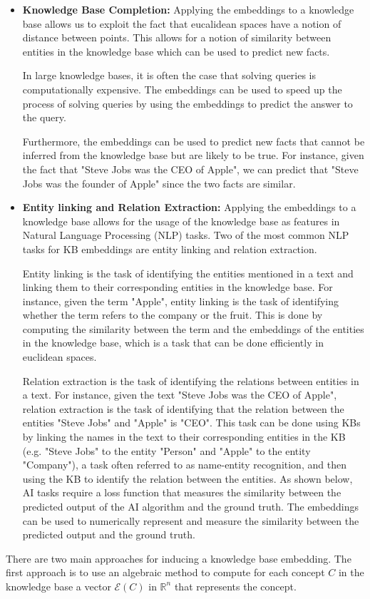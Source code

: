 \begin{itemize}
    \item \textbf{Knowledge Base Completion:} Applying the embeddings to a knowledge base allows us to
    exploit the fact that eucalidean spaces have a notion of distance between points.
    This allows for a notion of similarity between entities in the knowledge base
    which can be used to predict new facts.
    \par In large knowledge bases, it is often the case that solving queries is computationally expensive.
    The embeddings can be used to speed up the process of solving queries by using the embeddings to
    predict the answer to the query.
    \par Furthermore, the embeddings can be used to predict new facts that cannot be inferred from the knowledge base
    but are likely to be true.
    For instance, given the fact that "Steve Jobs was the CEO of Apple", we can predict that "Steve Jobs was the founder of Apple"
    since the two facts are similar.
    \item \textbf{Entity linking and Relation Extraction:} Applying the embeddings to a knowledge base allows for
    the usage of the knowledge base as features in Natural Language Processing (NLP) tasks.
    Two of the most common NLP tasks for KB embeddings are entity linking and relation extraction.
    \par Entity linking is the task of identifying the entities mentioned in a text and linking them to their corresponding
    entities in the knowledge base.
    For instance, given the term "Apple", entity linking is the task of identifying whether the term refers to the company or the fruit.
    This is done by computing the similarity between the term and the embeddings of the entities in the knowledge base,
    which is a task that can be done efficiently in euclidean spaces.
    \par Relation extraction is the task of identifying the relations between entities in a text.
    For instance, given the text "Steve Jobs was the CEO of Apple", relation extraction is the task of identifying that
    the relation between the entities "Steve Jobs" and "Apple" is "CEO".
    This task can be done using KBs by linking the names in the text to their corresponding entities in the KB (e.g. "Steve Jobs" to the entity "Person"
    and "Apple" to the entity "Company"), a task often referred to as name-entity recognition, and then using the KB to identify the relation between the entities.
    As shown below, AI tasks require a loss function that measures the similarity between 
    the predicted output of the AI algorithm and the ground truth.
    The embeddings can be used to numerically represent and measure the similarity between the predicted output and the ground truth.    
\end{itemize}

There are two main approaches for inducing a knowledge base embedding.
The first approach is to use an algebraic method to compute for each concept $C$ in the knowledge base
a vector $\mathcal{E}(C)$ in $\mathbb{R}^n$ that represents the concept.
